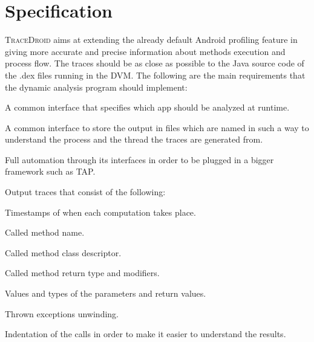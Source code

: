 \section{Specification}
\label{sec:scope_specification}

\textsc{TraceDroid} aims at extending the already default Android profiling
feature in giving more accurate and precise information about methods
execution and process flow. The traces should be as close as possible
to the Java source code of the .dex files running in the DVM. The
following are the main requirements that the dynamic analysis program
should implement:
\begin{itemize*}
    \item A common interface that specifies which app should be
      analyzed at runtime.
    \item A common interface to store the output in files which are
      named in such a way to understand the process and the thread the
      traces are generated from.
    \item Full automation through its interfaces in order to
      be plugged in a bigger framework such as TAP.
    \item Output traces that consist of the following:
      \begin{itemize*}
           \item Timestamps of when each computation takes place.
           \item Called method name.
           \item Called method class descriptor.
           \item Called method return type and modifiers.
           \item Values and types of the parameters and return values.
           \item Thrown exceptions unwinding.
           \item Indentation of the calls in order to make it easier
             to understand the results.
      \end{itemize*}
\end{itemize*}      
